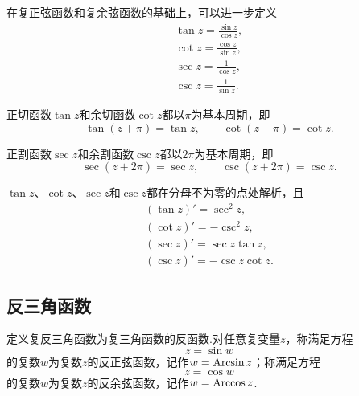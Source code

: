 \begin{definition}
在复正弦函数和复余弦函数的基础上，可以进一步定义\begin{gather}
\tan z = \frac{\sin z}{\cos z}, \\
\cot z = \frac{\cos z}{\sin z}, \\
\sec z = \frac{1}{\cos z}, \\
\csc z = \frac{1}{\sin z}.
\end{gather}
\end{definition}

\begin{property}
正切函数\(\tan z\)和余切函数\(\cot z\)都以\(\pi\)为基本周期，即\begin{equation*}
\tan(z+\pi) = \tan z,
\qquad
\cot(z+\pi) = \cot z.
\end{equation*}

正割函数\(\sec z\)和余割函数\(\csc z\)都以\(2\pi\)为基本周期，即\begin{equation*}
\sec(z+2\pi) = \sec z,
\qquad
\csc(z+2\pi) = \csc z.
\end{equation*}
\end{property}

\begin{property}
\(\tan z\)、\(\cot z\)、\(\sec z\)和\(\csc z\)都在分母不为零的点处解析，且\begin{gather}
(\tan z)' = \sec^2 z, \label{equation:解析函数.正切函数的导数} \\
(\cot z)' = -\csc^2 z, \label{equation:解析函数.余切函数的导数} \\
(\sec z)' = \sec z \tan z, \label{equation:解析函数.正割函数的导数} \\
(\csc z)' = -\csc z \cot z. \label{equation:解析函数.余割函数的导数}
\end{gather}
\end{property}

\subsection{反三角函数}
\begin{definition}
定义复反三角函数为复三角函数的反函数.对任意复变量\(z\)，称满足方程\begin{equation*}
z = \sin w
\end{equation*}的复数\(w\)为复数\(z\)的反正弦函数，记作\(w = \operatorname{Arcsin} z\)；称满足方程\begin{equation*}
z = \cos w
\end{equation*}的复数\(w\)为复数\(z\)的反余弦函数，记作\(w = \operatorname{Arccos} z\).
\end{definition}

